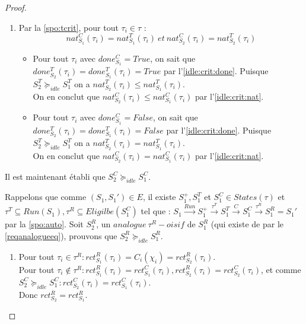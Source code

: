 \documentclass[12pt,a4paper,oneside]{book}
\theoremstyle{break}
\theoremstyle{breakplain}
\begin{document}
\begin{proof}
\begin{enumerate}
\begin{enumerate}[label=(\alph*)]
\item Par la \autoref{spo:tcrit}, pour tout $\tau_i \in \tau$ :
\begin{equation}
\label{idle:crit:nat}
nat_{S_1}^C(\tau_i) = nat_{S_1}^T(\tau_i)\ et\ nat_{S_2}^C(\tau_i) = nat_{S_2}^T(\tau_i)
\end{equation}
\begin{itemize}
\item Pour tout $\tau_i$ avec $done^C_{S_1} = True$, on sait que $done_{S_2}^T(\tau_i) = done_{S_1}^T(\tau_i) = True$ par l'\autoref{idle:crit:done}. Puisque $S^T_2 \succeq_{idle} S^T_1$ on a $nat_{S_2}^T(\tau_i)\leq nat_{S_1}^T(\tau_i)$.\\
On en conclut que $nat_{S_2}^C(\tau_i) \leq nat_{S_1}^C(\tau_i)$ par l'\autoref{idle:crit:nat}.
\item Pour tout $\tau_i$ avec $done^C_{S_1} = False$, on sait que $done_{S_2}^T(\tau_i) = done_{S_1}^T(\tau_i) = False$ par l'\autoref{idle:crit:done}. Puisque $S^T_2 \succeq_{idle} S^T_1$ on a $nat_{S_2}^T(\tau_i) = nat_{S_1}^T(\tau_i)$.\\
On en conclut que $nat_{S_2}^C(\tau_i) = nat_{S_1}^C(\tau_i)$ par l'\autoref{idle:crit:nat}.\\
\end{itemize}
\end{enumerate}
\end{enumerate}
Il est maintenant établi que $S^C_2 \succeq_{idle} S^C_1$.\\

\pagebreak

Rappelons que comme $(S_1, S_1') \in E$, il existe $S^{+}_1, S^{T}_1$ et $S^{C}_1 \in States(\tau)$ et $\tau^T \subseteq Run(S_1),\tau^R \subseteq Eligilbe(S^{C}_1) $ tel que : $S_1\xrightarrow{Run}S^{+}_1\xrightarrow{\tau^T}S^{T}_1\xrightarrow{C}S^{C}_1\xrightarrow{\tau^R}S_1^R=S_1'$ par la \autoref{spo:auto}. Soit $S_2^R$, un $analogue\ \tau^R-oisif$ de $S_1^R$ (qui existe de par le \autoref{reqanalogueeq}), prouvons que $S_2^R \succeq_{idle} S_1^R$.

\begin{enumerate}
\item Pour tout $\tau_i \in \tau^R : rct_{S_1}^R(\tau_i) = C_i(\chi_i) = rct_{S_2}^R(\tau_i)$.\\
Pour tout $\tau_i \notin \tau^R : rct_{S_1}^R(\tau_i) = rct_{S_1}^C(\tau_i), rct_{S_2}^R(\tau_i) = rct_{S_2}^C(\tau_i)$, et comme $S^C_2 \succeq_{idle} S^C_1 : rct_{S_2}^C(\tau_i) = rct_{S_1}^C(\tau_i)$.\\
Donc $rct_{S_2}^R = rct_{S_1}^R$.


\end{enumerate}
\end{proof}
\end{document}
